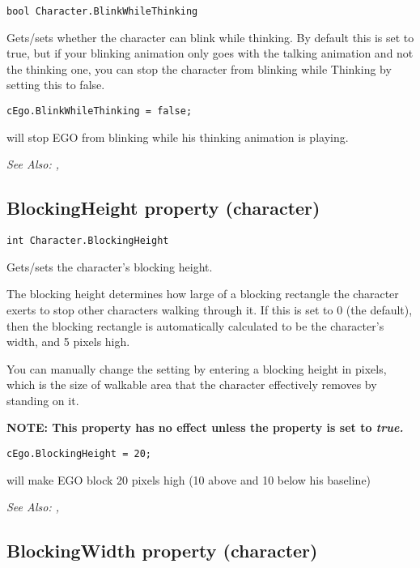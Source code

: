 \begin{verbatim}
bool Character.BlinkWhileThinking
\end{verbatim}
Gets/sets whether the character can blink while thinking. By default this is set to true,
but if your blinking animation only goes with the talking animation and not the thinking
one, you can stop the character from blinking while Thinking by setting this to false.

\begin{verbatim}
cEgo.BlinkWhileThinking = false;
\end{verbatim}
will stop EGO from blinking while his thinking animation is playing.

\it{See Also:} ,


\subsection{BlockingHeight property (character)}\label{Character.BlockingHeight}%

\begin{verbatim}
int Character.BlockingHeight
\end{verbatim}
Gets/sets the character's blocking height.

The blocking height determines how large of a blocking rectangle the character exerts to
stop other characters walking through it. If this is set to 0 (the default), then the
blocking rectangle is automatically calculated to be the character's width, and 5 pixels
high.

You can manually change the setting by entering a blocking height in pixels, which is the
size of walkable area that the character effectively removes by standing on it.

\bf{NOTE:} This property has no effect unless the  property
is set to \it{true}.

\begin{verbatim}
cEgo.BlockingHeight = 20;
\end{verbatim}
will make EGO block 20 pixels high (10 above and 10 below his baseline)

\it{See Also:} ,


\subsection{BlockingWidth property (character)}\label{Character.BlockingWidth}%

